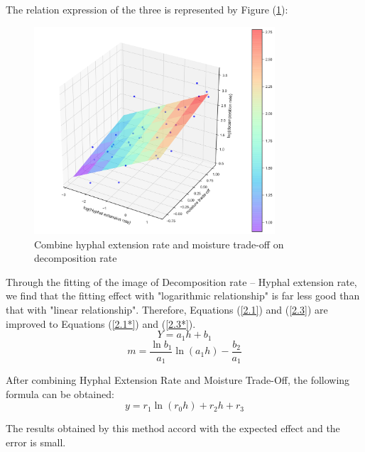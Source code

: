 The relation expression of the three is represented by Figure (\ref{4}):
\begin{figure}[H]
    \centering
    \includegraphics[width=0.8\textwidth]{./code/fig5.jpg}
    \caption{Combine hyphal extension rate and moisture trade-off on decomposition rate}\label{4}
\end{figure}

Through the fitting of the image of Decomposition rate -- Hyphal extension rate, we find that the fitting effect with "logarithmic relationship" is far less good than that with "linear relationship". Therefore, Equations (\ref{2.1}) and (\ref{2.3}) are improved to Equations (\ref{2.1*}) and (\ref{2.3*}).
\begin{equation}\label{2.1*}
    Y=a_{1}h+b_{1}
\end{equation}
\begin{equation}\label{2.3*}
    m=\frac{\ln{b_{1}}}{a_{1}}\ln{(a_{1}h)}-\frac{b_{2}}{a_{1}} 
\end{equation}

After combining Hyphal Extension Rate and Moisture Trade-Off, the following formula can be obtained:
\begin{equation}\label{2.5}
    y=r_{1}\ln(r_{0}h)+r_{2}h+r_{3}
\end{equation}

The results obtained by this method accord with the expected effect and the error is small.